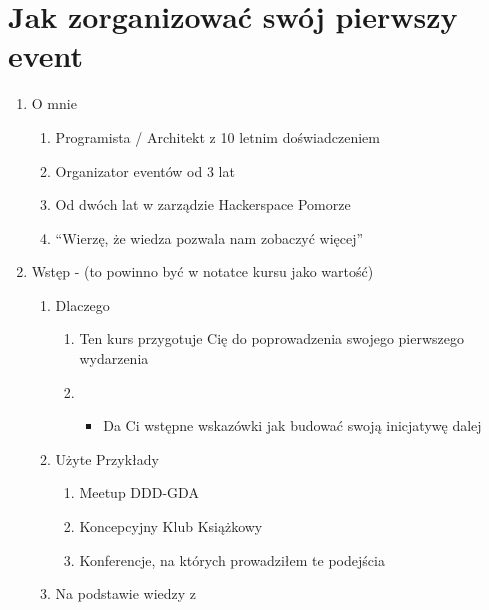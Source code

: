 \section{Jak zorganizować swój pierwszy
event}\label{jak-zorganizowaux107-swuxf3j-pierwszy-event}

\begin{enumerate}
\def\labelenumi{\arabic{enumi}.}
\tightlist
\item
  O mnie

  \begin{enumerate}
  \def\labelenumii{\arabic{enumii}.}
  \tightlist
  \item
    Programista / Architekt z 10 letnim doświadczeniem
  \item
    Organizator eventów od 3 lat
  \item
    Od dwóch lat w zarządzie Hackerspace Pomorze
  \item
    ``Wierzę, że wiedza pozwala nam zobaczyć więcej''
  \end{enumerate}
\item
  Wstęp - (to powinno być w notatce kursu jako wartość)

  \begin{enumerate}
  \def\labelenumii{\arabic{enumii}.}
  \tightlist
  \item
    Dlaczego

    \begin{enumerate}
    \def\labelenumiii{\arabic{enumiii}.}
    \tightlist
    \item
      Ten kurs przygotuje Cię do poprowadzenia swojego pierwszego
      wydarzenia
    \item
      \begin{itemize}
      \tightlist
      \item
        Da Ci wstępne wskazówki jak budować swoją inicjatywę dalej
      \end{itemize}
    \end{enumerate}
  \item
    Użyte Przykłady

    \begin{enumerate}
    \def\labelenumiii{\arabic{enumiii}.}
    \tightlist
    \item
      Meetup DDD-GDA
    \item
      Koncepcyjny Klub Książkowy
    \item
      Konferencje, na których prowadziłem te podejścia
    \end{enumerate}
  \item
    Na podstawie wiedzy z


\end{enumerate}
\end{enumerate}

